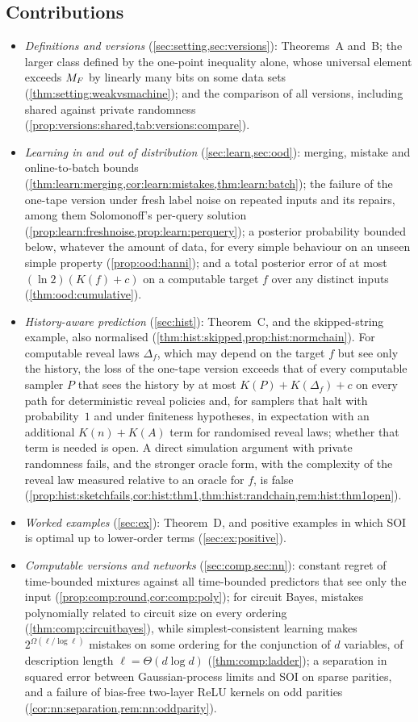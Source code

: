 \subsection{Contributions}\label{sec:intro:contrib}

\begin{itemize}[leftmargin=*]
\item \emph{Definitions and versions} (\cref{sec:setting,sec:versions}): Theorems~A and~B; the larger class defined by the one-point inequality alone, whose universal element exceeds $M_{F}$ by linearly many bits on some data sets (\cref{thm:setting:weakvsmachine}); and the comparison of all versions, including shared against private randomness (\cref{prop:versions:shared,tab:versions:compare}).
\item \emph{Learning in and out of distribution} (\cref{sec:learn,sec:ood}): merging, mistake and online-to-batch bounds (\cref{thm:learn:merging,cor:learn:mistakes,thm:learn:batch}); the failure of the one-tape version under fresh label noise on repeated inputs and its repairs, among them Solomonoff's per-query solution (\cref{prop:learn:freshnoise,prop:learn:perquery}); a posterior probability bounded below, whatever the amount of data, for every simple behaviour on an unseen simple property (\cref{prop:ood:hanni}); and a total posterior error of at most $(\ln2)(K(f)+c)$ on a computable target $f$ over any distinct inputs (\cref{thm:ood:cumulative}).
\item \emph{History-aware prediction} (\cref{sec:hist}): Theorem~C, and the skipped-string example, also normalised (\cref{thm:hist:skipped,prop:hist:normchain}). For computable reveal laws $\Delta_f$, which may depend on the target $f$ but see only the history, the loss of the one-tape version exceeds that of every computable sampler $P$ that sees the history by at most $K(P)+K(\Delta_f)+c$ on every path for deterministic reveal policies and, for samplers that halt with probability~$1$ and under finiteness hypotheses, in expectation with an additional $K(n)+K(A)$ term for randomised reveal laws; whether that term is needed is open. A direct simulation argument with private randomness fails, and the stronger oracle form, with the complexity of the reveal law measured relative to an oracle for $f$, is false (\cref{prop:hist:sketchfails,cor:hist:thm1,thm:hist:randchain,rem:hist:thm1open}).
\item \emph{Worked examples} (\cref{sec:ex}): Theorem~D, and positive examples in which SOI is optimal up to lower-order terms (\cref{sec:ex:positive}).
\item \emph{Computable versions and networks} (\cref{sec:comp,sec:nn}): constant regret of time-bounded mixtures against all time-bounded predictors that see only the input (\cref{prop:comp:round,cor:comp:poly}); for circuit Bayes, mistakes polynomially related to circuit size on every ordering (\cref{thm:comp:circuitbayes}), while simplest-consistent learning makes $2^{\Omega(\ell/\log\ell)}$ mistakes on some ordering for the conjunction of $d$ variables, of description length $\ell=\Theta(d\log d)$ (\cref{thm:comp:ladder}); a separation in squared error between Gaussian-process limits and SOI on sparse parities, and a failure of bias-free two-layer ReLU kernels on odd parities (\cref{cor:nn:separation,rem:nn:oddparity}).

\end{itemize}
